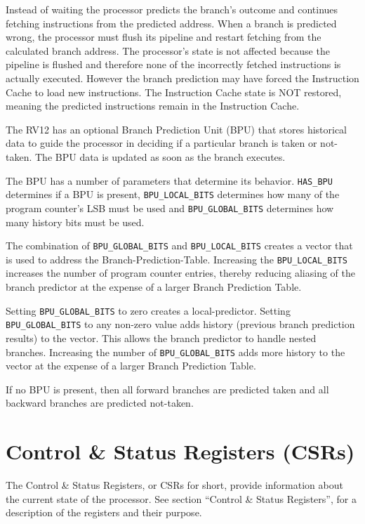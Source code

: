 Instead of waiting the processor predicts the branch's outcome and continues fetching instructions from the predicted address.
When a branch is predicted wrong, the processor must flush its pipeline and restart fetching from the calculated branch address. 
The processor's state is not affected because the pipeline is flushed and therefore none of the incorrectly fetched instructions is actually executed. 
However the branch prediction may have forced the Instruction Cache to load new instructions. 
The Instruction Cache state is NOT restored, meaning the predicted instructions remain in the Instruction Cache.

The RV12 has an optional Branch Prediction Unit (BPU) that stores historical data to guide the processor in deciding if a particular branch is taken or not-taken. 
The BPU data is updated as soon as the branch executes.

The BPU has a number of parameters that determine its behavior. \texttt{HAS\_BPU}
determines if a BPU is present, \texttt{BPU\_LOCAL\_BITS} determines how many of
the program counter's LSB must be used and  \texttt{BPU\_GLOBAL\_BITS}  determines
how many history bits must be used.

The combination of \texttt{BPU\_GLOBAL\_BITS} and \texttt{BPU\_LOCAL\_BITS} creates a
vector that is used to address the Branch-Prediction-Table. Increasing
the \texttt{BPU\_LOCAL\_BITS} increases the number of program counter entries,
thereby reducing aliasing of the branch predictor at the expense of a
larger Branch Prediction Table.

Setting \texttt{BPU\_GLOBAL\_BITS} to zero creates a local-predictor. Setting
\texttt{BPU\_GLOBAL\_BITS} to any non-zero value adds history (previous branch
prediction results) to the vector. This allows the branch predictor to
handle nested branches. Increasing the number of \texttt{BPU\_GLOBAL\_BITS} adds
more history to the vector at the expense of a larger Branch Prediction
Table.

If no BPU is present, then all forward branches are predicted taken and
all backward branches are predicted not-taken.

\section{Control \& Status Registers (CSRs)} \label{control-status-registers-csrs}

The Control \& Status Registers, or CSRs for short, provide information
about the current state of the processor. See section ``Control \&
Status Registers'', for a description of the registers and their
purpose.

